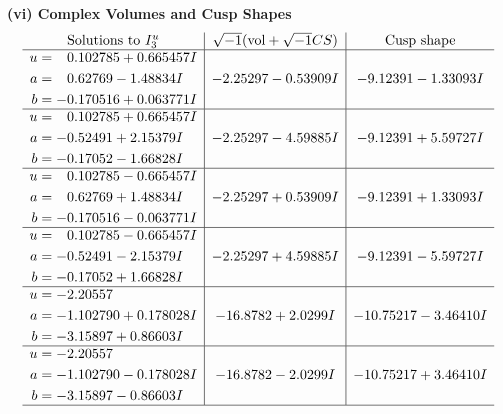 \documentclass[1p]{elsarticle_modified}
\theoremstyle{definition}
\newcommand{\I}{\sqrt{-1}}
\begin{document}
\newpage\flushleft \textbf{(vi) Complex Volumes and Cusp Shapes}
$$\begin{array}{c|c|c}  
\text{Solutions to }I^u_{3}& \I (\text{vol} + \sqrt{-1}CS) & \text{Cusp shape}\\
 \hline 
\begin{aligned}
u &= \phantom{-}0.102785 + 0.665457 I \\
a &= \phantom{-}0.62769 - 1.48834 I \\
b &= -0.170516 + 0.063771 I\end{aligned}
 & -2.25297 - 0.53909 I & -9.12391 - 1.33093 I \\ \hline\begin{aligned}
u &= \phantom{-}0.102785 + 0.665457 I \\
a &= -0.52491 + 2.15379 I \\
b &= -0.17052 - 1.66828 I\end{aligned}
 & -2.25297 - 4.59885 I & -9.12391 + 5.59727 I \\ \hline\begin{aligned}
u &= \phantom{-}0.102785 - 0.665457 I \\
a &= \phantom{-}0.62769 + 1.48834 I \\
b &= -0.170516 - 0.063771 I\end{aligned}
 & -2.25297 + 0.53909 I & -9.12391 + 1.33093 I \\ \hline\begin{aligned}
u &= \phantom{-}0.102785 - 0.665457 I \\
a &= -0.52491 - 2.15379 I \\
b &= -0.17052 + 1.66828 I\end{aligned}
 & -2.25297 + 4.59885 I & -9.12391 - 5.59727 I \\ \hline\begin{aligned}
u &= -2.20557\phantom{ +0.000000I} \\
a &= -1.102790 + 0.178028 I \\
b &= -3.15897 + 0.86603 I\end{aligned}
 & -16.8782 + 2.0299 I & -10.75217 - 3.46410 I \\ \hline\begin{aligned}
u &= -2.20557\phantom{ +0.000000I} \\
a &= -1.102790 - 0.178028 I \\
b &= -3.15897 - 0.86603 I\end{aligned}
 & -16.8782 - 2.0299 I & -10.75217 + 3.46410 I\\
 \hline 
 \end{array}$$\newpage\newpage\renewcommand{\arraystretch}{1}
\end{document}
